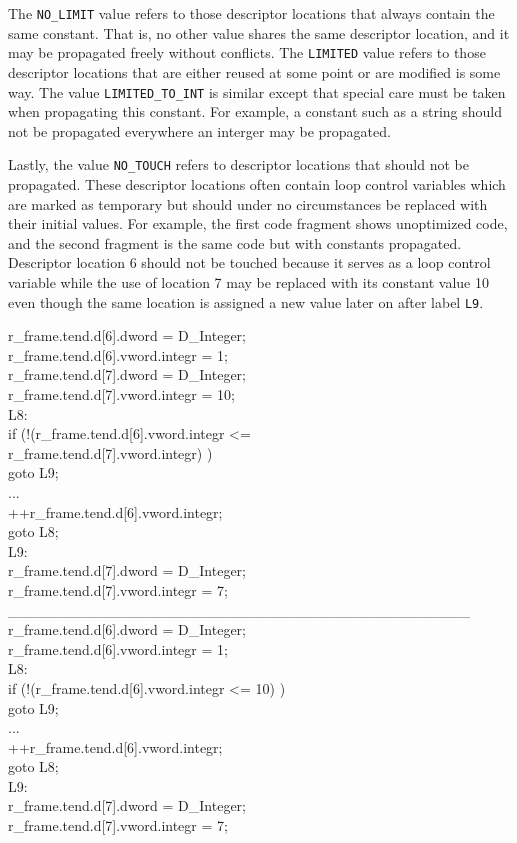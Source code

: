The \texttt{NO\_LIMIT} value refers to those descriptor locations that
always contain the same constant. That is, no other value shares the
same descriptor location, and it may be propagated freely without
conflicts. The \texttt{LIMITED} value refers to those descriptor
locations that are either reused at some point or are modified is some
way. The value \texttt{LIMITED\_TO\_INT} is similar except that
special care must be taken when propagating this constant. For
example, a constant such as a string should not be propagated
everywhere an interger may be propagated.

Lastly, the value \texttt{NO\_TOUCH} refers to descriptor locations
that should not be propagated. These descriptor locations often
contain loop control variables which are marked as temporary but
should under no circumstances be replaced with their initial
values. For example, the first code fragment shows unoptimized code,
and the second fragment is the same code but with constants
propagated. Descriptor location 6 should not be touched because it
serves as a loop control variable while the use of location 7 may be
replaced with its constant value 10 even though the same location is
assigned a new value later on after label \texttt{L9}.

\begin{iconcode}
\>   r\_frame.tend.d[6].dword = D\_Integer; \\
\>   r\_frame.tend.d[6].vword.integr = 1; \\
\>   r\_frame.tend.d[7].dword = D\_Integer; \\
\>   r\_frame.tend.d[7].vword.integr = 10; \\
L8: \\
\>   if (!(r\_frame.tend.d[6].vword.integr {\textless}= \\
\> \> \> \> \> r\_frame.tend.d[7].vword.integr) ) \\
\>  goto L9; \\
\>   ... \\
\>   ++r\_frame.tend.d[6].vword.integr; \\
\>   goto L8; \\
L9: \\
\>   r\_frame.tend.d[7].dword = D\_Integer; \\
\>   r\_frame.tend.d[7].vword.integr = 7; \\
\_\_\_\_\_\_\_\_\_\_\_\_\_\_\_\_\_\_\_\_\_\_\_\_\_\_\_\_\_\_\_\_\_\_\_\_\_\_\_\_\_\_\_\_ \\
\>   r\_frame.tend.d[6].dword = D\_Integer; \\
\>   r\_frame.tend.d[6].vword.integr = 1; \\
L8: \\
\>   if (!(r\_frame.tend.d[6].vword.integr {\textless}= 10) ) \\
\> \>    goto L9; \\
\>   ... \\
\>   ++r\_frame.tend.d[6].vword.integr; \\
\>   goto L8; \\
L9: \\
\>   r\_frame.tend.d[7].dword = D\_Integer; \\
\>   r\_frame.tend.d[7].vword.integr = 7;
\end{iconcode}


